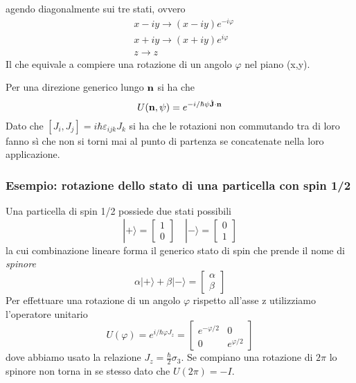 agendo diagonalmente sui tre stati, ovvero
\begin{align*}
	& x-iy \to (x-iy)e^{-i \varphi} \\[0.3cm]
	& x+iy \to (x+iy)e^{i \varphi} \\[0.3cm]
	& z \to z
\end{align*}
Il che equivale a compiere una rotazione di un angolo $\varphi$ nel piano (x,y).

Per una direzione generico lungo $\bold{n}$ si ha che 
\begin{equation*}
	U(\bold{n},\psi) = e^{-i/\hbar \psi \hat{\bold{J}} \cdot \bold{n}} 
\end{equation*}
Dato che $[J_{i},J_{j}] = i \hbar \varepsilon_{ijk}J_{k}$ si ha che le rotazioni non commutando tra di loro fanno s\`i che non si torni mai al punto di partenza se concatenate nella loro applicazione.

\subsubsection{Esempio: rotazione dello stato di una particella con spin 1/2}

Una particella di spin 1/2 possiede due stati possibili 
\begin{equation*}
	|+ \rangle = \left[ \begin{array}{c}
		1 \\ 0
	\end{array}\right]
	\quad
	|- \rangle = \left[ \begin{array}{c}
		0 \\ 1
	\end{array}\right]
\end{equation*}
la cui combinazione lineare forma il generico stato di spin che prende il nome di \textit{spinore}
\begin{equation*}
	\alpha |+ \rangle + \beta |- \rangle = \left[ \begin{array}{c}
		\alpha \\ \beta
	\end{array}\right]
\end{equation*}
Per effettuare una rotazione di un angolo $\varphi$ rispetto all'asse z utilizziamo l'operatore unitario 
\begin{equation*}
	U(\varphi) = e^{i/\hbar \varphi J_{z}} = \left[ \begin{array}{cc}
		e^{-\varphi/2} & 0\\ 0 & e^{\varphi/2}
	\end{array}\right]
\end{equation*}
dove abbiamo usato la relazione $J_{z} = \frac{\hbar }{2} \sigma_3$. Se compiano una rotazione di $2 \pi$ lo spinore non torna in se stesso dato che $U(2\pi) = -I$. 

